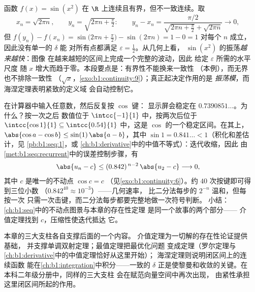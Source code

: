 \begin{example}\label{ex:b1:continuity:sinx2}
函数 $f(x) = \sin(x^2)$ 在
$\R$ 上连续且有界，但不一致连续。取
\[
x_n = \sqrt{2\pi n}, \qquad y_n = \sqrt{2\pi n + \tfrac\pi2}:
\qquad
y_n - x_n = \frac{\pi/2}{\sqrt{2\pi n + \frac\pi2} +
\sqrt{2\pi n}} \longrightarrow 0 ,
\]
但 $f(y_n) - f(x_n) = \sin\bigl(2\pi n + \frac\pi2\bigr) -
\sin(2\pi n) = 1 - 0 = 1$ 对每个 $n$ 成立，因此没有单一的 $\delta$ 能
对所有点都满足 $\varepsilon = \frac12$。从几何上看，
$\sin(x^2)$ 的振荡\emph{越来越快}：图像
在越来越短的区间上完成一个完整的波动，因此
给定 $\varepsilon$ 所需的水平尺度
随 $x$ 增大而趋于零。本段要点是：有界性不能换来一致性
（本例），而无界也不排除一致性
（$\sqrt x$，\cref{exo:b1:continuity:9}）；真正起决定作用的是
\emph{振荡模}，而海涅定理表明紧致的定义域
会自动控制它。
\end{example}

\begin{example}[计算器实验的解释]\label{ex:b1:continuity:cositeration}
在计算器中输入任意数，然后反复按 $\cos$ 键：
显示屏会稳定在 $0.7390851\dots$。为什么？按一次之后
数值位于 $\intcc{-1}{1}$ 中，按两次后位于 $\intcc{\cos 1}{1}
\subseteq \intcc{0.54}{1}$ 中，这是 $\cos$ 的一个稳定区间。在其上，
$\abs{\cos a - \cos b} \leq \sin(1)\,\abs{a - b}$，其中 $\sin 1 =
0.841\dots < 1$（积化和差估计，见
\cref{pb:b1:seq:1}，或
\cref{ch:b1:derivative}中的中值不等式）：迭代收缩，因此
由\cref{met:b1:seq:recurrent}中的误差控制步骤，有
\[
\abs{u_n - c} \leq (0.842)^{\,n-2}\,\abs{u_2 - c}
\longrightarrow 0 ,
\]
其中 $c$ 是唯一的不动点 $\cos c = c$
（见\cref{exo:b1:continuity:6}）。约 $40$ 次按键即可得到三位小数
（$0.842^{40} \approx 10^{-3}$）——几何速率，
比二分法每步的 $2^{-n}$ 温和，但每按一次
只需一次击键，而二分法每步都要完整地做一次符号判断。
小结：\cref{ch:b1:seq}中的不动点图景与本章的存在性定理
是同一个故事的两个部分——
介值定理找到 $c$，压缩性使迭代抵达
它。
\end{example}

\begin{remark}[这些定理的后续应用]
本章的三大支柱各自支撑后面的一个内容。
介值定理为一切解的存在性论证提供基础，
并支撑单调双射定理；最值定理把最优化问题
变成定理（罗尔定理与
\cref{ch:b1:derivative}中的中值定理恰好从这里开始）；
海涅定理则说明闭区间上的连续函数
能在\cref{ch:b1:integration}中积分——一致的 $\delta$
正是使黎曼和收敛的关键。在本科二年级分册中，同样的三大支柱
会在赋范向量空间中再次出现，
由紧性承担这里闭区间所起的作用。
\end{remark}

